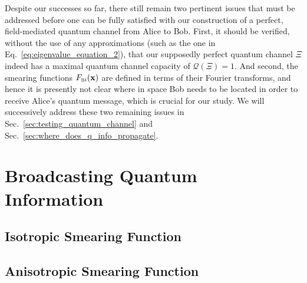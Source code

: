 \documentclass[a4paper,12pt]{article}
\begin{document}
Despite our successes so far, there still remain two pertinent issues that must be addressed before one can be fully satisfied with our construction of a perfect, field-mediated quantum channel from Alice to Bob. First, it should be verified, without the use of any approximations (such as the one in Eq.~\eqref{eq:eigenvalue_equation_2}), that our supposedly perfect quantum channel $\Xi$ indeed has a maximal quantum channel capacity of $\mathcal Q(\Xi)=1$. And second, the smearing functions $F_{\textsc{b}i}(\mathbf x)$ are defined in terms of their Fourier transforms, and hence it is presently not clear where in space Bob needs to be located in order to receive Alice's quantum message, which is crucial for our study. We will successively address these two remaining issues in Sec.~\ref{sec:testing_quantum_channel} and Sec.~\ref{sec:where_does_q_info_propagate}.


\section{Broadcasting Quantum Information}

\subsection*{Isotropic Smearing Function}

\subsection*{Anisotropic Smearing Function}

\appendix

\acknowledgments






\end{document}
